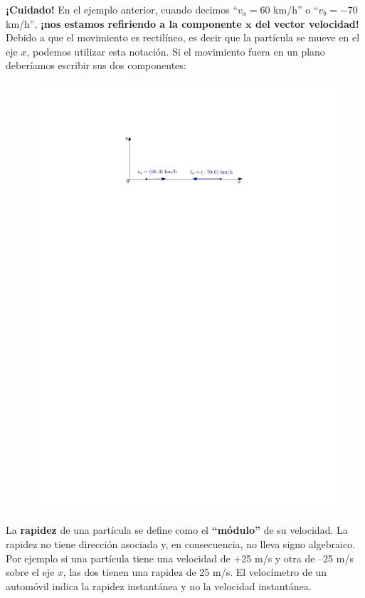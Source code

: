 {\bf \color{BrickRed} {¡Cuidado!}} En el ejemplo anterior, cuando decimos ``$v_a= 60$ km/h'' o ``$v_b= -70$ km/h'', {\bf ¡nos estamos refiriendo a la componente $\mathbold{x}$ del vector velocidad!} Debido a que el movimiento es rectilíneo, es decir que la partícula se mueve en el eje $x$, podemos utilizar esta notación. Si el movimiento fuera en un plano deberíamos escribir sus dos componentes:

\begin{figure}[h!]
\centering
 \includegraphics[width=.6\textwidth]{img/velocidad_instantanea3.pdf}
\end{figure}

La \textbf{rapidez} de una partícula se define como el {\bf ``módulo''} de su velocidad. La rapidez no tiene dirección asociada y, en consecuencia, no lleva signo algebraico. Por ejemplo si una partícula tiene una velocidad de +25 m/s y otra de –25 m/s sobre el eje $x$, las dos tienen una rapidez de 25 m/s. El velocímetro de un automóvil indica la rapidez instantánea y no la velocidad instantánea.



% 
 